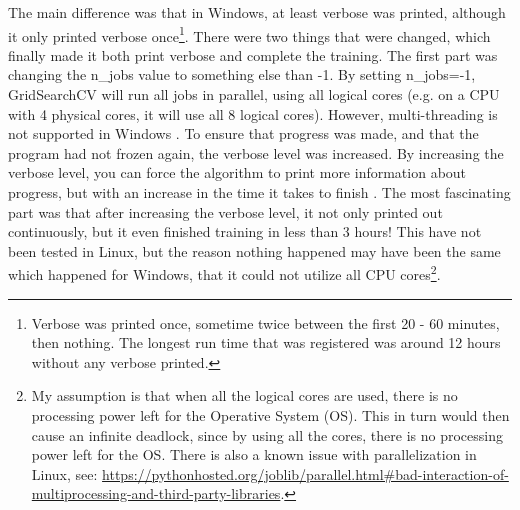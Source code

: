 The main difference was that in Windows, at least verbose was printed, although it only printed verbose once\footnote{
	Verbose was printed once, sometime twice between the first 20 - 60 minutes, then nothing.
	The longest run time that was registered was around 12 hours without any verbose printed.
}.
There were two things that were changed, which finally made it both print verbose and complete the training.
The first part was changing the n\_jobs value to something else than -1. 
By setting n\_jobs=-1, GridSearchCV will run all jobs in parallel, using all logical cores (e.g. on a CPU with 4 physical cores, it will use all 8 logical cores). 
However, multi-threading is not supported in Windows \cite{GS2015}. 
To ensure that progress was made, and that the program had not frozen again, the verbose level was increased.
By increasing the verbose level, you can force the algorithm to print more information about progress, but with an increase in the time it takes to finish \cite{Manuel2015, user29912432014}. 
The most fascinating part was that after increasing the verbose level, it not only printed out continuously, but it even finished training in less than 3 hours!
This have not been tested in Linux, but the reason nothing happened may have been the same which happened for Windows, that it could not utilize all CPU cores\footnote{
	My assumption is that when all the logical cores are used, there is no processing power left for the Operative System (OS). 
	This in turn would then cause an infinite deadlock, since by using all the cores, there is no processing power left for the OS.
	There is also a known issue with parallelization in Linux, see: 
	\url{https://pythonhosted.org/joblib/parallel.html\#bad-interaction-of-multiprocessing-and-third-party-libraries}.
}.























